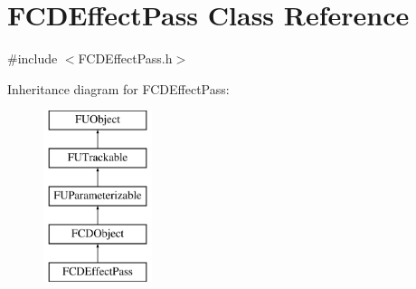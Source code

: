 \hypertarget{classFCDEffectPass}{
\section{FCDEffectPass Class Reference}
\label{classFCDEffectPass}
}


{\ttfamily \#include $<$FCDEffectPass.h$>$}

Inheritance diagram for FCDEffectPass:\begin{figure}[H]
\begin{center}
\leavevmode
\includegraphics[height=5.000000cm]{classFCDEffectPass}
\end{center}
\end{figure}
